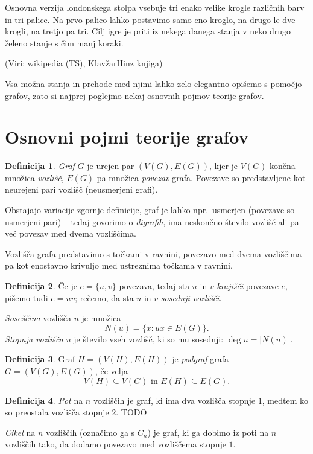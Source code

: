 \documentclass[12pt,a4paper]{amsart}
\theoremstyle{definition} %
\newtheorem{definicija}{Definicija}[section]
\theoremstyle{plain} %
\newcommand{\graf}[1]{\ensuremath{#1 = (V(#1), E(#1))}}
\DeclareMathOperator {\stopnja} {deg}
\begin{document}
Osnovna verzija londonskega stolpa vsebuje tri enako velike krogle različnih barv in tri palice. Na prvo palico lahko postavimo samo eno kroglo, na drugo le dve krogli, na tretjo pa tri. Cilj igre je priti iz nekega danega stanja v neko drugo želeno stanje s čim manj koraki.

(Viri: wikipedia (TS), KlavžarHinz knjiga)

Vsa možna stanja in prehode med njimi lahko zelo elegantno opišemo s pomočjo grafov, zato si najprej poglejmo nekaj osnovnih pojmov teorije grafov.

\section{Osnovni pojmi teorije grafov}

\begin{definicija}
	\emph{Graf} $G$ je urejen par $(V(G), E(G))$, kjer je $V(G)$ končna množica \emph{vozlišč}, $E(G)$ pa množica \emph{povezav} grafa. Povezave so predstavljene kot neurejeni pari vozlišč (neusmerjeni grafi).
\end{definicija}

Obstajajo variacije zgornje definicije, graf je lahko npr.\ usmerjen (povezave so usmerjeni pari) -- tedaj govorimo o \emph{digrafih}, ima neskončno število vozlišč ali pa več povezav med dvema vozliščima.

Vozlišča grafa predstavimo s točkami v ravnini, povezavo med dvema vozliščima pa kot enostavno krivuljo med ustreznima točkama v ravnini.

\begin{definicija}
	Če je $e = \{ u,v \}$ povezava, tedaj sta $u$ in $v$ \emph{krajišči} povezave $e$, pišemo tudi $e = uv$; rečemo, da sta $u$ in $v$ \emph{sosednji vozlišči}.
	
	\emph{Soseščina} vozlišča $u$ je množica 
	\[ N(u) = \{ x\colon ux \in E(G) \} .\]
	\emph{Stopnja vozlišča} $u$ je število vseh vozlišč, ki so mu sosednji: $\stopnja u = |N(u)|$.
\end{definicija}

\begin{definicija}
	Graf $\graf{H}$ je \emph{podgraf} grafa $\graf{G}$, če velja 
	\[ V(H) \subseteq V(G) \text{ in } E(H) \subseteq E(G). \]
\end{definicija}

\begin{definicija}
	\emph{Pot} na $n$ vozliščih je graf, ki ima dva vozlišča stopnje $1$, medtem ko so preostala vozlišča stopnje $2$. TODO
	
	\emph{Cikel} na $n$ vozliščih (označimo ga s $C_n$) je graf, ki ga dobimo iz poti na $n$ vozliščih tako, da dodamo povezavo med vozliščema stopnje $1$.
\end{definicija}
\end{document}
